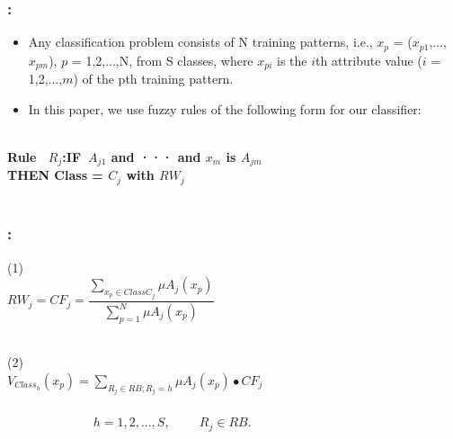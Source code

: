 \documentclass{beamer}
\begin{document}
\begin{CJK*}{UTF8}{bsmi}

\begin{frame}
\frametitle{\insertsection : \insertsubsection}
	\begin{itemize}
		\item Any classification problem consists of N training patterns, i.e., $\mathit{x}_{p}$ = ($\mathit{x}_{p1}$,...,$\mathit{x}_{pm}$), $\mathit{p}$ = 1,2,...,N, from S classes, where $\mathit{x}_{pi}$ is the $\mathit{i}$th attribute value ($\mathit{i}$ = 1,2,...,$\mathit{m}$) of the pth training pattern.
		\item  In this paper, we use fuzzy rules of the following form for our classifier:
	\end{itemize}
	\begin{block}{ }
~\\
\centering\textbf{Rule ~$\mathit{R}_{j}$:IF~$\mathit{A}_{j1}$ and ··· and $\mathit{x}_{m}$ is $\mathit{A}_{jm}$}\\
\centering\textbf{THEN Class = $\mathit{C}_{j}$ with $\mathit{RW}_{j}$}\\
~\\
\end{block}

\end{frame}


\begin{frame}
	\frametitle{\insertsection : \insertsubsection}

	\begin{block}{ (1)}
		~\\
	\centering\textbf{${RW}_{\mathit{j}} = {CF}_{\mathit{j}}=\dfrac{\sum_{x_{p} \in ClassC_{j}}^{} {\mu A_{j}(x_{p})}}{\sum_{p=1}^{N} {\mu A_{j}(x_{p})}}$}\\
		~\\
	\end{block}
		\begin{block}{ (2)}
			~\\
			\centering\textbf{${V}_{Class_\mathit{h}}(x_{p}) = \sum_{R_{j} \in RB ; R_{j}=\mathit{h}}^{} {\mu A_{j} (x_{p}) \bullet CF_{\mathit{j}}}$}\\
		~\\
		~~~~~~~~~~~~~	\textbf{$\mathit{h}=1,2,...,S,$~~~~$R_{\mathit{j}} \in RB.$}\\
			
			~\\
		\end{block}
	

\end{frame}
\end{CJK*}
\end{document}
